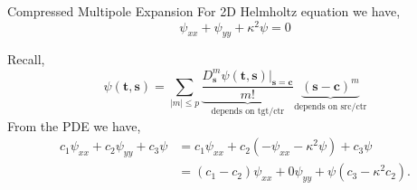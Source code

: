 \documentclass[10pt]{beamer}
\def\b#1{\mathbf{ #1}}
\begin{document}
%
%
%
%
%
%
%
%
%
%
%

\begin{frame}[fragile]{Compressed Multipole Expansion}
 For 2D Helmholtz equation we have,
 \[
  \psi_{x x} + \psi_{y y} + \kappa^2 \psi = 0
 \]

 Recall, 
 \[
 \psi(\b t, \b s) = \sum_{|m| \le p} \underbrace{\frac{D_{\b s}^m \psi(\b t, \b s)\Bigr|_{\b s = \b c}}{m!}}_{\text{depends on tgt/ctr}} \underbrace{(\b s - \b c)^m}_{\text{depends on src/ctr}}
 \]
 From the PDE we have, 
 \begin{align*}
  c_1 \psi_{x x} +  c_2 \psi_{y y} + c_3 \psi 
  &= c_1 \psi_{x x} +  c_2 (-\psi_{x x} - \kappa^2 \psi) + c_3 \psi \\
  &= (c_1 - c_2) \psi_{x x} + 0 \psi_{y y} +\psi (c_3 - \kappa^2 c_2).
 \end{align*}
\end{frame}
\end{document}
